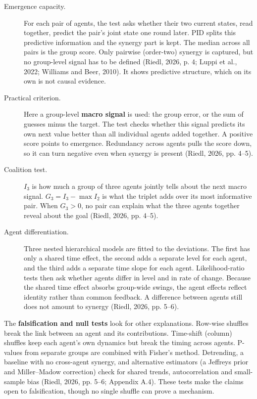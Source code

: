 \documentclass[12pt,a4paper,oneside]{report}
\begin{document}
\begin{description}
\item[Emergence capacity.] For each pair of agents, the test asks whether their two current states, read together, predict the pair’s joint state one round later. PID splits this predictive information and the synergy part is kept. The median across all pairs is the group score. Only pairwise (order-two) synergy is captured, but no group-level signal has to be defined (Riedl, 2026, p. 4; Luppi et al., 2022; Williams and Beer, 2010). It shows predictive structure, which on its own is not causal evidence.
\item[Practical criterion.] Here a group-level \textbf{macro signal} is used: the group error, or the sum of guesses minus the target. The test checks whether this signal predicts its own next value better than all individual agents added together. A positive score points to emergence. Redundancy across agents pulls the score down, so it can turn negative even when synergy is present (Riedl, 2026, pp. 4–5).
\item[Coalition test.] \(I_3\) is how much a group of three agents jointly tells about the next macro signal. \(G_3 = I_3 - \max I_2\) is what the triplet adds over its most informative pair. When \(G_3 > 0\), no pair can explain what the three agents together reveal about the goal (Riedl, 2026, pp. 4–5).
\item[Agent differentiation.] Three nested hierarchical models are fitted to the deviations. The first has only a shared time effect, the second adds a separate level for each agent, and the third adds a separate time slope for each agent. Likelihood-ratio tests then ask whether agents differ in level and in rate of change. Because the shared time effect absorbs group-wide swings, the agent effects reflect identity rather than common feedback. A difference between agents still does not amount to synergy (Riedl, 2026, pp. 5–6).
\end{description}

The \textbf{falsification and null tests} look for other explanations. Row-wise shuffles break the link between an agent and its contributions. Time-shift (column) shuffles keep each agent’s own dynamics but break the timing across agents. P-values from separate groups are combined with Fisher’s method. Detrending, a baseline with no cross-agent synergy, and alternative estimators (a Jeffreys prior and Miller–Madow correction) check for shared trends, autocorrelation and small-sample bias (Riedl, 2026, pp. 5–6; Appendix A.4). These tests make the claims open to falsification, though no single shuffle can prove a mechanism.
\end{document}
